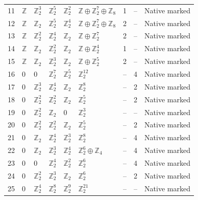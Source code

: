 \documentclass[10pt]{article}
\begin{document}
\begin{longtable}{r|lllll|rrl}
11 & $\mathbb{Z}$ & $\mathbb{Z}_{2}^{3}$ & $\mathbb{Z}_{2}^{5}$ & $\mathbb{Z}_{2}^{2}$ & $\mathbb{Z}\oplus \mathbb{Z}_{2}^{7}\oplus \mathbb{Z}_{8}$ & 1 & -- & Native marked\\
12 & $\mathbb{Z}$ & $\mathbb{Z}_{2}$ & $\mathbb{Z}_{2}^{5}$ & $\mathbb{Z}_{2}^{4}$ & $\mathbb{Z}\oplus \mathbb{Z}_{2}^{7}\oplus \mathbb{Z}_{8}$ & 2 & -- & Native marked\\
13 & $\mathbb{Z}$ & $\mathbb{Z}_{2}^{2}$ & $\mathbb{Z}_{2}^{4}$ & $\mathbb{Z}_{2}$ & $\mathbb{Z}\oplus \mathbb{Z}_{2}^{7}$ & 2 & -- & Native marked\\
14 & $\mathbb{Z}$ & $\mathbb{Z}_{2}$ & $\mathbb{Z}_{2}^{2}$ & $\mathbb{Z}_{2}$ & $\mathbb{Z}\oplus \mathbb{Z}_{2}^{4}$ & 1 & -- & Native marked\\
15 & $\mathbb{Z}$ & $\mathbb{Z}_{2}$ & $\mathbb{Z}_{2}^{3}$ & $\mathbb{Z}_{2}$ & $\mathbb{Z}\oplus \mathbb{Z}_{2}^{5}$ & 2 & -- & Native marked\\
16 & $0$ & $0$ & $\mathbb{Z}_{2}^{7}$ & $\mathbb{Z}_{2}^{5}$ & $\mathbb{Z}_{2}^{12}$ & -- & 4 & Native marked\\
17 & $0$ & $\mathbb{Z}_{2}^{3}$ & $\mathbb{Z}_{2}^{4}$ & $\mathbb{Z}_{2}$ & $\mathbb{Z}_{2}^{8}$ & -- & 2 & Native marked\\
18 & $0$ & $\mathbb{Z}_{2}^{2}$ & $\mathbb{Z}_{2}^{2}$ & $\mathbb{Z}_{2}$ & $\mathbb{Z}_{2}^{5}$ & -- & 2 & Native marked\\
19 & $0$ & $\mathbb{Z}_{2}^{2}$ & $\mathbb{Z}_{2}$ & $0$ & $\mathbb{Z}_{2}^{3}$ & -- & -- & Native marked\\
20 & $0$ & $\mathbb{Z}_{2}^{2}$ & $\mathbb{Z}_{2}^{2}$ & $\mathbb{Z}_{2}$ & $\mathbb{Z}_{2}^{5}$ & -- & 2 & Native marked\\
21 & $0$ & $\mathbb{Z}_{2}$ & $\mathbb{Z}_{2}^{4}$ & $\mathbb{Z}_{2}^{3}$ & $\mathbb{Z}_{2}^{8}$ & -- & 4 & Native marked\\
22 & $0$ & $\mathbb{Z}_{2}$ & $\mathbb{Z}_{2}^{3}$ & $\mathbb{Z}_{2}^{4}$ & $\mathbb{Z}_{2}^{6}\oplus \mathbb{Z}_{4}$ & -- & 4 & Native marked\\
23 & $0$ & $0$ & $\mathbb{Z}_{2}^{4}$ & $\mathbb{Z}_{2}^{2}$ & $\mathbb{Z}_{2}^{6}$ & -- & 4 & Native marked\\
24 & $0$ & $\mathbb{Z}_{2}^{2}$ & $\mathbb{Z}_{2}^{3}$ & $\mathbb{Z}_{2}$ & $\mathbb{Z}_{2}^{6}$ & -- & 2 & Native marked\\
25 & $0$ & $\mathbb{Z}_{2}^{4}$ & $\mathbb{Z}_{2}^{8}$ & $\mathbb{Z}_{2}^{9}$ & $\mathbb{Z}_{2}^{21}$ & -- & -- & Native marked\\

\end{longtable}
\end{document}
